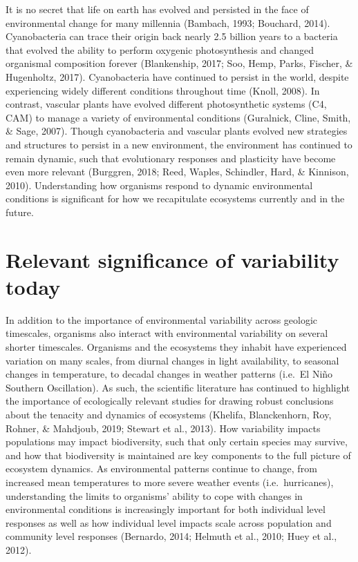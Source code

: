 \documentclass[12pt,twoside]{reedthesis}
\begin{document}
It is no secret that life on earth has evolved and persisted in the face of environmental change for many millennia (Bambach, 1993; Bouchard, 2014). Cyanobacteria can trace their origin back nearly 2.5 billion years to a bacteria that evolved the ability to perform oxygenic photosynthesis and changed organismal composition forever (Blankenship, 2017; Soo, Hemp, Parks, Fischer, \& Hugenholtz, 2017). Cyanobacteria have continued to persist in the world, despite experiencing widely different conditions throughout time (Knoll, 2008). In contrast, vascular plants have evolved different photosynthetic systems (C4, CAM) to manage a variety of environmental conditions (Guralnick, Cline, Smith, \& Sage, 2007). Though cyanobacteria and vascular plants evolved new strategies and structures to persist in a new environment, the environment has continued to remain dynamic, such that evolutionary responses and plasticity have become even more relevant (Burggren, 2018; Reed, Waples, Schindler, Hard, \& Kinnison, 2010). Understanding how organisms respond to dynamic environmental conditions is significant for how we recapitulate ecosystems currently and in the future.

\hypertarget{relevant-significance-of-variability-today}{%
\section{Relevant significance of variability today}\label{relevant-significance-of-variability-today}}

In addition to the importance of environmental variability across geologic timescales, organisms also interact with environmental variability on several shorter timescales. Organisms and the ecosystems they inhabit have experienced variation on many scales, from diurnal changes in light availability, to seasonal changes in temperature, to decadal changes in weather patterns (i.e.~El Niño Southern Oscillation). As such, the scientific literature has continued to highlight the importance of ecologically relevant studies for drawing robust conclusions about the tenacity and dynamics of ecosystems (Khelifa, Blanckenhorn, Roy, Rohner, \& Mahdjoub, 2019; Stewart et al., 2013). How variability impacts populations may impact biodiversity, such that only certain species may survive, and how that biodiversity is maintained are key components to the full picture of ecosystem dynamics. As environmental patterns continue to change, from increased mean temperatures to more severe weather events (i.e.~hurricanes), understanding the limits to organisms' ability to cope with changes in environmental conditions is increasingly important for both individual level responses as well as how individual level impacts scale across population and community level responses (Bernardo, 2014; Helmuth et al., 2010; Huey et al., 2012).
\end{document}
